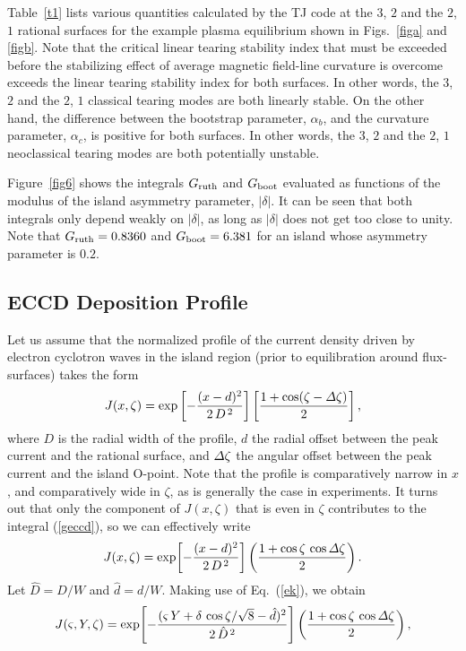 \documentclass[12pt,prb,aps]{revtex4-1}
\begin{document}
Table~\ref{t1} lists various quantities calculated by the TJ code at the $3$, $2$ and the $2$, $1$ rational surfaces for the example plasma equilibrium shown in Figs.~\ref{figa} and \ref{figb}. 
Note that the critical linear tearing stability index that must be exceeded before the stabilizing effect of average magnetic field-line curvature is overcome\,\cite{tear10} exceeds the linear tearing stability index for both surfaces. In other words, the $3$, $2$ and the $2$, $1$ classical tearing modes are both linearly stable. On the other hand, the difference between the bootstrap parameter, $\alpha_b$, and the curvature parameter, $\alpha_c$, is positive
for both surfaces. In other words, the $3$, $2$ and the $2$, $1$ neoclassical tearing modes  are both potentially unstable. 

Figure~\ref{fig6} shows the integrals $G_{\rm ruth}$ and $G_{\rm boot}$ evaluated as functions of the modulus of the island asymmetry
parameter, $|\delta|$. It can be seen that both integrals only depend weakly on $|\delta|$, as long as $|\delta|$ does not get too close to
unity.\cite{ece6,island} Note that $G_{\rm ruth} = 0.8360$ and $G_{\rm boot} =6.381$ for an island whose asymmetry parameter is $0.2$. 
 
\subsection{ECCD Deposition Profile}
 Let us assume that the normalized profile of the current density driven by electron cyclotron waves in the island region (prior
 to equilibration around flux-surfaces) takes the form
 \begin{equation}
 J(x,\zeta) = \exp\left[-\frac{(x-d)^2}{2\,D^{\,2}}\right]\left[\frac{1+\cos(\zeta-{\mit\Delta}\zeta)}{2}\right],
 \end{equation}
 where $D$ is the radial width of the profile, $d$  the radial offset between the peak current and the rational surface, and
${\mit\Delta}\zeta$ the angular offset between the peak current and the island O-point. Note that the profile is  comparatively narrow in $x$, and comparatively
wide in $\zeta$, as is  generally the case in experiments. It turns out that  only the component of $J(x,\zeta)$ that is even in $\zeta$ contributes to the integral (\ref{geccd}), so we can effectively write
\begin{equation}
J(x,\zeta)= \exp\!\left[-\frac{(x-d)^2}{2\,D^{\,2}}\right]\left(\frac{1+\cos\zeta\,\cos{\mit\Delta}\zeta}{2}\right).
\end{equation}
Let $\hat{D}=D/W$ and $\hat{d}=d/W$. Making use of Eq.~(\ref{ek}), we obtain 
\begin{equation}
J(\varsigma,Y,\zeta) =  \exp\!\left[-\frac{(\varsigma\,Y+\delta\,\cos\zeta/\sqrt{8}-\hat{d})^2}{2\,\hat{D}^{\,2}}\right]\left(\frac{1+\cos\zeta\,\cos{\mit\Delta}\zeta}{2}\right),
\end{equation}
\end{document}
